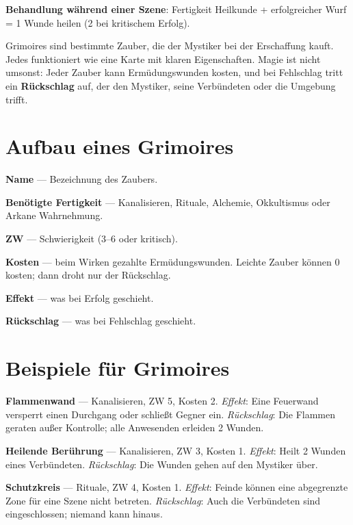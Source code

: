 \documentclass[10pt,a4paper]{article}
\begin{document}
\textbf{Behandlung während einer Szene}: Fertigkeit Heilkunde + erfolgreicher Wurf = 1 Wunde heilen (2 bei kritischem Erfolg).

Grimoires sind bestimmte Zauber, die der Mystiker bei der Erschaffung kauft. Jedes funktioniert wie eine Karte mit klaren Eigenschaften. Magie ist nicht umsonst: Jeder Zauber kann Ermüdungswunden kosten, und bei Fehlschlag tritt ein \textbf{Rückschlag} auf, der den Mystiker, seine Verbündeten oder die Umgebung trifft.

\section*{Aufbau eines Grimoires}
\textbf{Name} — Bezeichnung des Zaubers.

\textbf{Benötigte Fertigkeit} — Kanalisieren, Rituale, Alchemie, Okkultismus oder Arkane Wahrnehmung.

\textbf{ZW} — Schwierigkeit (3–6 oder kritisch).

\textbf{Kosten} — beim Wirken gezahlte Ermüdungswunden. Leichte Zauber können 0 kosten; dann droht nur der Rückschlag.

\textbf{Effekt} — was bei Erfolg geschieht.

\textbf{Rückschlag} — was bei Fehlschlag geschieht.

\section*{Beispiele für Grimoires}
\textbf{Flammenwand} — Kanalisieren, ZW 5, Kosten 2. \textit{Effekt}: Eine Feuerwand versperrt einen Durchgang oder schließt Gegner ein. \textit{Rückschlag}: Die Flammen geraten außer Kontrolle; alle Anwesenden erleiden 2 Wunden.

\textbf{Heilende Berührung} — Kanalisieren, ZW 3, Kosten 1. \textit{Effekt}: Heilt 2 Wunden eines Verbündeten. \textit{Rückschlag}: Die Wunden gehen auf den Mystiker über.

\textbf{Schutzkreis} — Rituale, ZW 4, Kosten 1. \textit{Effekt}: Feinde können eine abgegrenzte Zone für eine Szene nicht betreten. \textit{Rückschlag}: Auch die Verbündeten sind eingeschlossen; niemand kann hinaus.
\end{document}
